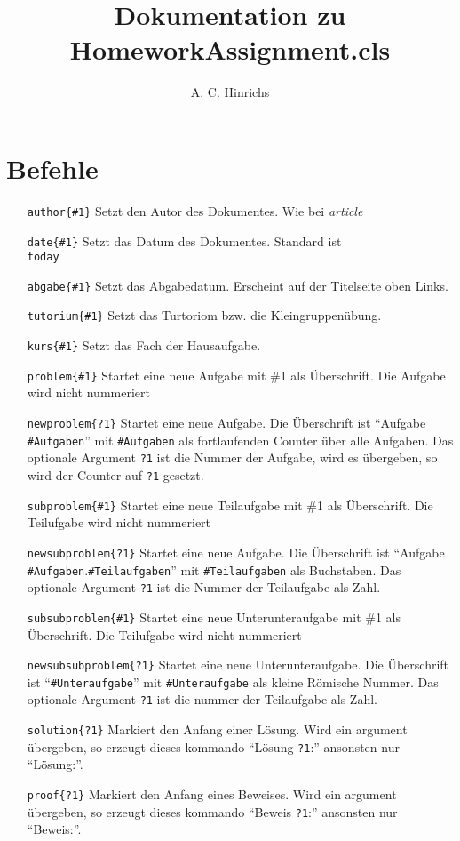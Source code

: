 \documentclass[a4papr]{article}
\title{Dokumentation zu HomeworkAssignment.cls}
\author{A. C. Hinrichs}
\begin{document}
\maketitle
\section{Befehle}
\begin{itemize}
\item[\texttt{author\{\#1\}}] Setzt den Autor des Dokumentes. Wie bei
  \textit{article}
\item[\texttt{date\{\#1\}}] Setzt das Datum des Dokumentes. Standard
  ist \texttt{\\today}
\item[\texttt{abgabe\{\#1\}}] Setzt das Abgabedatum. Erscheint auf der
  Titelseite oben Links.
\item[\texttt{tutorium\{\#1\}}] Setzt das Turtoriom bzw. die
  Kleingruppen\"ubung.
\item[\texttt{kurs\{\#1\}}] Setzt das Fach der Hausaufgabe.
\item[\texttt{problem\{\#1\}}] Startet eine neue Aufgabe mit \#1 als
  \"Uberschrift.  Die Aufgabe wird nicht nummeriert
\item[\texttt{newproblem\{?1\}}] Startet eine neue Aufgabe. Die
  \"Uberschrift ist \enquote{Aufgabe \texttt{\#Aufgaben}} mit
  \texttt{\#Aufgaben} als fortlaufenden Counter \"uber alle Aufgaben.
  Das optionale Argument \texttt{?1} ist die Nummer der Aufgabe, wird
  es \"ubergeben, so wird der Counter auf \texttt{?1} gesetzt.
\item[\texttt{subproblem\{\#1\}}] Startet eine neue Teilaufgabe mit
  \#1 als \"Uberschrift.  Die Teilufgabe wird nicht nummeriert
\item[\texttt{newsubproblem\{?1\}}] Startet eine neue Aufgabe. Die
  \"Uberschrift ist \enquote{Aufgabe
    \texttt{\#Aufgaben}.\texttt{\#Teilaufgaben}} mit
  \texttt{\#Teilaufgaben} als Buchstaben.  Das optionale Argument
  \texttt{?1} ist die Nummer der Teilaufgabe als Zahl.
\item[\texttt{subsubproblem\{\#1\}}] Startet eine neue
  Unterunteraufgabe mit \#1 als \"Uberschrift.  Die Teilufgabe wird
  nicht nummeriert
\item[\texttt{newsubsubproblem\{?1\}}] Startet eine neue
  Unterunteraufgabe. Die \"Uberschrift ist
  \enquote{\texttt{\#Unteraufgabe}} mit \texttt{\#Unteraufgabe} als
  kleine R\"omische Nummer.  Das optionale Argument \texttt{?1} ist
  die nummer der Teilaufgabe als Zahl.
\item[\texttt{solution\{?1\}}] Markiert den Anfang einer L\"osung.
  Wird ein argument \"ubergeben, so erzeugt dieses kommando
  \enquote{L\"osung \texttt{?1}:} ansonsten nur \enquote{L\"osung:}.
\item[\texttt{proof\{?1\}}] Markiert den Anfang eines Beweises.  Wird
  ein argument \"ubergeben, so erzeugt dieses kommando \enquote{Beweis
    \texttt{?1}:} ansonsten nur \enquote{Beweis:}.
\end{itemize}
\end{document}
